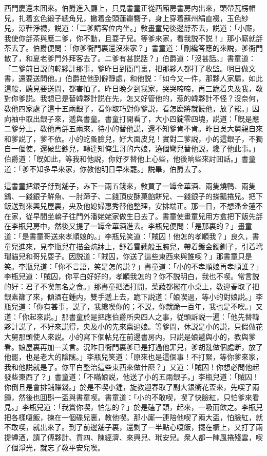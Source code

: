 西門慶還未囬來。伯爵進入廳上，只見書童正從西廂房書房内出來，頭帶瓦楞帽兒，扎着玄色緞子總角兒，撇着金頭蓮瓣簪子，身上穿着蘇州絹直裰，玉色紗𧜽兒，涼鞋淨襪，説道：「二爹請客位内坐。」敎畫童兒後邊㧱茶去，説道：「小廝，我使你㧱茶與應二爹，你不動，且耍子兒。等爹來家，看我説不説！」那小廝就㧱茶去了。伯爵便問：「你爹衙門裏還沒來家？」書童道：「剛纔答應的來説，爹衙門散了，和夏老爹門外拜客去了。二爹有甚説話？」伯爵道：「沒甚話。」書童道：「二爹前日説的韓夥計那事，爹昨日到衙門裏，把那夥人都打了收監。明日做文書，還要送問他。」伯爵拉他到僻靜處，和他説：「如今又一件，那夥人家屬，如此這般，聽見要送問，都害怕了。昨日晚夕到我家，哭哭啼啼，再三跪着央及我，敎對你爹説。我想已是替韓夥計説在先，怎又好管他的，惹的韓夥計不怪？沒奈何，敎他四家處了這十五兩銀子，看你取巧對你爹説，看怎麽將就饒他，放了罷。」因向袖中取出銀子來，遞與書童。書童打開看了，大小四錠零四塊，説道：「旣是應二爹分上，敎他再㧱五兩來，待小的替他説，還不知爹肯不肯。昨日吳大舅親自來和爹説了，爹不依。小的虼蚤臉兒，好大面皮兒！實對二爹説，小的這銀子，不獨自一個使，還破些鈔兒，轉達知俺生哥的六娘，遶個彎兒替他説，纔了他此事。」伯爵道：「旣如此，等我和他説，你好歹替他上心些，他後晌些來討囬話。」書童道：「爹不知多早來家，你教他明日早來罷。」説畢，伯爵去了。

這書童把銀子㧱到舖子，み下一兩五錢來，敎買了一罈金華酒、兩隻燒鴨、兩隻鷄、一錢銀子鮮魚、一肘蹄子、二錢頂皮酥菓餡餅兒、一錢銀子的搽瓤捲兒。把下飯送到來興兒屋裏，央及他媳婦惠秀替他整理，安排端正。那一日，不想潘金蓮不在家，従早間坐轎子往門外潘姥姥家做生日去了。書童使畫童兒用方盒把下飯先㧱在李瓶兒房中，然後又提了一罈金華酒進去。李瓶兒便問：「是那裏的？」畫童道：「是書童哥送來孝順娘的。」李瓶兒笑道：「賊囚！他怎的孝順我？」良久，書童兒進來，見李瓶兒在描金炕牀上，舒着雪藕般玉腕兒，帶着鍍金鐲釧子，引着玳瑁貓兒和哥兒耍子。因説道：「賊囚，你送了這些東西來與誰喫？」那書童只是笑。李瓶兒道：「你不言語，笑是怎的説？」書童道：「小的不孝順娘再孝順誰？」李瓶兒道：「賊囚，你平白好好的，孝順我怎的？你不説明白，我也不喫。常言説的好：君子不喫無名之食。」那書童把酒打開，菜蔬都擺在小桌上，敎迎春取了把銀素篩了來，傾酒在鍾内，雙手遞上去，跪下説道：「娘喫過，等小的對娘説。」李瓶兒道：「你有甚事，説了，我纔喫你的；不説，你就跪一百年，我也是不喫。」又道：「你起來説。」那書童於是把應伯爵所央四人之事，従頭訴説一遍：「他先替韓夥計説了，不好來説得，央及小的先來禀過娘。等爹問，休説是小的説，只假做花大舅那頭使人來説。小的寫下個帖兒在前邊書房内，只説是娘遞與小的，教與爹看。娘屋裏再加一羙言。況昨日衙門裏爹已是打過他罪兒，爹胡亂做個處断，放了他罷，也是老大的陰隲。」李瓶兒笑道：「原來也是這個事！不打緊，等你爹來家，我和他説就是了。你平白整治這些東西來做什麽？」又道：「賊囚！你想必問他起發些東西了？」書童道：「不瞞娘説，他送了小的五兩銀子。」李瓶兒道：「賊囚！你倒且是會排舖赚錢。」於是不喫小鍾，旋教迎春取了副大銀衢花盃來，先喫了兩鍾，然後也囬斟一盃與書童喫。書童道：「小的不敢喫，喫了快臉紅，只怕爹來看見。」李瓶兒道：「我賞你喫，怕怎的？」於是磕了頭，起來，一吸而飲之。李瓶兒把各樣嗄飯，揀在一個碟兒裏，教他喫。那小廝一連陪他喫了兩大盃，怕臉紅，就不敢喫，就出來了。到了前邊舖子裏，還剩了一半點心嗄飯，擺在櫃上，又打了兩提罈酒，請了傅夥計、賁四、陳經濟、來興兒、玳安兒。衆人都一陣風捲殘雲，喫了個淨光，就忘了敎平安兒喫。

